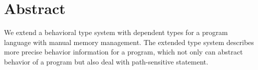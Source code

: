 \section{Abstract}
\label{sec:abstraction}
We extend a behavioral type system with dependent types for a program
language with manual memory management. The extended type system
describes more precise behavior information for a program, which not
only can abstract behavior of a program but also deal with
path-sensitive statement.

 
